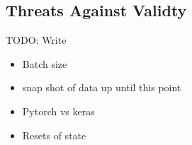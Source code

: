 \subsection{Threats Against Validty}
TODO: Write

\begin{itemize}
  \item Batch size
  \item snap shot of data up until this point
  \item Pytorch vs keras
  \item Resets of state
\end{itemize}

